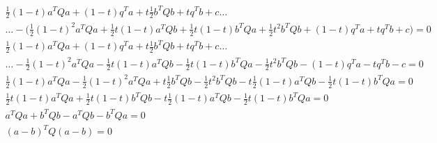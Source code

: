 \documentclass{article}
\begin{document}
\begin{equation}
\begin{split}
\frac{1}{2}(1-t)a^TQa +(1-t)q^Ta + t\frac{1}{2} b^TQb+tq^Tb +c \dots\\
\dots -\big(\frac{1}{2}(1-t)^2 a^TQa + \frac{1}{2}t(1-t)a^TQb + \frac{1}{2}t(1-t)b^TQa + \frac{1}{2}t^2b^TQb + (1-t)q^Ta+t q^Tb +c \big) = 0\\
\frac{1}{2}(1-t)a^TQa +(1-t)q^Ta + t\frac{1}{2} b^TQb+tq^Tb +c\dots\\
\dots -\frac{1}{2}(1-t)^2 a^TQa - \frac{1}{2}t(1-t)a^TQb - \frac{1}{2}t(1-t)b^TQa - \frac{1}{2}t^2b^TQb - (1-t)q^Ta-t q^Tb -c = 0\\
\frac{1}{2}(1-t)a^TQa -\frac{1}{2}(1-t)^2 a^TQa + t\frac{1}{2} b^TQb - \frac{1}{2}t^2b^TQb - t\frac{1}{2}(1-t)a^TQb - \frac{1}{2}t(1-t)b^TQa  = 0\\
\frac{1}{2}t(1-t)a^TQa + \frac{1}{2} t(1-t)b^TQb                  - t\frac{1}{2}(1-t)a^TQb - \frac{1}{2}t(1-t)b^TQa  = 0\\
a^TQa +  b^TQb                  - a^TQb - b^TQa  = 0\\
(a-b)^TQ(a-b)  = 0\\
\end{split}
\end{equation}
\end{document}
